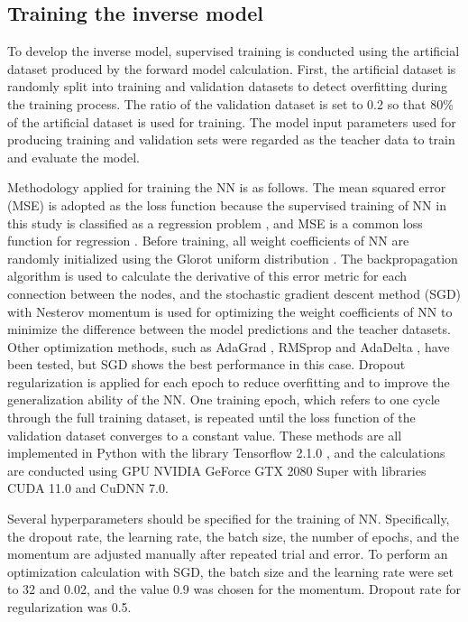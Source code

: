 \subsection{Training the inverse model}
To develop the inverse model, supervised training is conducted using the artificial dataset produced by the forward model calculation. First, the artificial dataset is randomly split into training and validation datasets to detect overfitting during the training process. The ratio of the validation dataset is set to 0.2 so that 80\% of the artificial dataset is used for training. The model input parameters used for producing training and validation sets were regarded as the teacher data to train and evaluate the model.

Methodology applied for training the NN is as follows. The mean squared error (MSE) is adopted as the loss function because the supervised training of NN in this study is classified as a regression problem \citep{Specht1991}, and MSE is a common loss function for regression \citep{Bishop2006,Hastie2009,ShalevShwartz2014}. Before training, all weight coefficients of NN are randomly initialized using the Glorot uniform distribution \citep{Glorot2010}. The backpropagation algorithm \citep{Rumelhart1986} is used to calculate the derivative of this error metric for each connection between the nodes, and the stochastic gradient descent method (SGD) with Nesterov momentum \citep{NESTEROV1983} is used for optimizing the weight coefficients of NN to minimize the difference between the model predictions and the teacher datasets. Other optimization methods, such as AdaGrad \citep{Duchi2011}, RMSprop \citep{Tieleman2012} and AdaDelta \citep{Zeiler2012}, have been tested, but SGD shows the best performance in this case. Dropout regularization \citep{Srivastava2014} is applied for each epoch to reduce overfitting and to improve the generalization ability of the NN. One training epoch, which refers to one cycle through the full training dataset, is repeated until the loss function of the validation dataset converges to a constant value. These methods are all implemented in Python with the library Tensorflow 2.1.0 \citep{Raschka2019}, and the calculations are conducted using GPU NVIDIA GeForce GTX 2080 Super with libraries CUDA 11.0 and CuDNN 7.0.

Several hyperparameters should be specified for the training of NN. Specifically, the dropout rate, the learning rate, the batch size, the number of epochs, and the momentum are adjusted manually after repeated trial and error. To perform an optimization calculation with SGD, the batch size and the learning rate were set to 32 and 0.02, and the value 0.9 was chosen for the momentum. Dropout rate for regularization was 0.5. 

